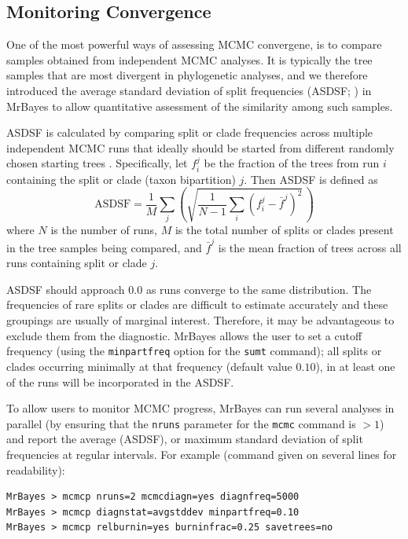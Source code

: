 \documentclass[12pt]{book}
\begin{document}
\subsection{Monitoring Convergence}
\label{monitoringConvergence}

One of the most powerful ways of assessing MCMC convergene, is to compare samples obtained from
independent MCMC analyses. It is typically the tree samples that are most divergent in phylogenetic
analyses, and we therefore introduced the average standard deviation of split frequencies (ASDSF;
\citep{lakner08}) in MrBayes to allow quantitative assessment of the similarity among such samples.

ASDSF is calculated by comparing split or clade frequencies across multiple independent MCMC runs
that ideally should be started from different randomly chosen starting trees \citep{lakner08}.
Specifically, let $f_i^j$ be the fraction of the trees from run $i$ containing the split or clade
(taxon bipartition) $j$. Then ASDSF is defined as
\begin{equation*}
\text{ASDSF} = \frac{1}{M} \sum_j \left( \sqrt{ \frac{1}{N-1} \sum_i (f_i^j - \bar{f}^j)^2} \, \right)
\end{equation*}
where $N$ is the number of runs, $M$ is the total number of splits or clades present in the tree
samples being compared, and $\bar{f}^j$ is the mean fraction of trees across all runs containing
split or clade $j$.

ASDSF should approach $0.0$ as runs converge to the same distribution. The frequencies of rare
splits or clades are difficult to estimate accurately and these groupings are usually of marginal
interest. Therefore, it may be advantageous to exclude them from the diagnostic. MrBayes allows the
user to set a cutoff frequency (using the \texttt{minpartfreq} option for the \texttt{sumt}
command); all splits or clades occurring minimally at that frequency (default value $0.10$), in at
least one of the runs will be incorporated in the ASDSF.

To allow users to monitor MCMC progress, MrBayes can run several analyses in parallel (by ensuring
that the \texttt{nruns} parameter for the \texttt{mcmc} command is $>1$) and report the average
(ASDSF), or maximum standard deviation of split frequencies at regular intervals. For example
(command given on several lines for readability):

\begin{Verbatim}
MrBayes > mcmcp nruns=2 mcmcdiagn=yes diagnfreq=5000
MrBayes > mcmcp diagnstat=avgstddev minpartfreq=0.10
MrBayes > mcmcp relburnin=yes burninfrac=0.25 savetrees=no
\end{Verbatim}
\end{document}

